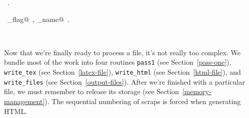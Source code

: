 \documentclass{report}
\begin{document}
\begin{flushleft}
\begin{minipage}{\linewidth}
\begin{list}{}{}
\mbox{}\verb@    sprintf(aux_name, "%s%s%s.aux", dirpath, path_sep, trim);@\\
\mbox{}\verb@    *dot = '.';@\\
\mbox{}\verb@  }@\\
\mbox{}\verb@  else {@\\
\mbox{}\verb@    sprintf(tex_name, "%s%s%s.tex", dirpath, path_sep, trim);@\\
\mbox{}\verb@    sprintf(aux_name, "%s%s%s.aux", dirpath, path_sep, trim);@\\
\mbox{}\verb@    *q++ = '.';@\\
\mbox{}\verb@    *q++ = 'w';@\\
\mbox{}\verb@    *q = '\0';@\\
\mbox{}\verb@  }@\\
\mbox{}\verb@}@{\NWsep}
\end{list}
\vspace{-1ex}
\footnotesize\addtolength{\baselineskip}{-1ex}
\begin{list}{}{\setlength{\itemsep}{-\parsep}\setlength{\itemindent}{-\leftmargin}}
\item \NWtxtMacroRefIn\ .
\end{list}
\vspace{-2ex}
\footnotesize\addtolength{\baselineskip}{-1ex}
\begin{list}{}{\setlength{\itemsep}{-\parsep}\setlength{\itemindent}{-\leftmargin}}
\item \NWtxtIdentsUsed\nobreak\  \verb@html_flag@\nobreak\ , \verb@source_name@\nobreak\ .\end{list}
\end{minipage}\\[4ex]
\end{flushleft}
Now that we're finally ready to process a file, it's not really too
complex.  We bundle most of the work into four routines \verb|pass1|
(see Section~\ref{pass-one}), \verb|write_tex| (see
Section~\ref{latex-file}), \verb|write_html| (see
Section~\ref{html-file}), and \verb|write_files| (see
Section~\ref{output-files}). After we're finished with a
particular file, we must remember to release its storage (see
Section~\ref{memory-management}).  The sequential numbering of scraps
is forced when generating HTML.
\end{document}
